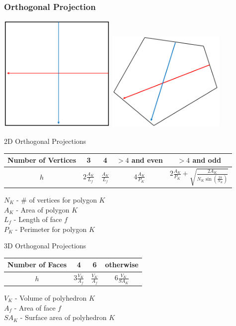 \documentclass[compress,10pt]{beamer}
\begin{document}
\begin{frame}[t]
\frametitle{Orthogonal Projection}
{
\vspace{1cm}
{}\includegraphics[width=0.425\textwidth]{images/Orth_proj_square.png} \hfill
{}\includegraphics[width=0.425\textwidth]{images/Orth_proj_pentagon.png}
}
{
\begin{block}{2D Orthogonal Projections}
\begin{table}
\centering
\begin{tabular}{|c|c|c|c|c|}
	\hline
	Number of Vertices & 3 & 4 & $>4$ and even& $>4$ and odd \\
	\hline
	$h$ & $2 \frac{A_K}{L_f}$ & $\frac{A_K}{L_f}$ & $4 \frac{A_K}{P_K}$ & $2 \frac{A_K}{P_K} + \sqrt{\frac{2 A_K}{N_K \sin(\frac{2 \pi}{N_K})}}$ \\
	\hline
\end{tabular}
\end{table}
\vspace{3mm}
$N_K$ - \# of vertices for polygon $K$\\
$A_K$ - Area of polygon $K$\\
$L_f$  - Length of face $f$\\
$P_K$ - Perimeter for polygon $K$
\end{block}
\begin{block}{3D Orthogonal Projections}
\begin{table}
\centering
\begin{tabular}{|c|c|c|c|}
	\hline
	Number of Faces & 4 & 6 & otherwise \\
	\hline
	$h$ & $3 \frac{V_K}{A_f}$ & $\frac{V_K}{A_f}$ & $6 \frac{V_K}{SA_K}$  \\ [1ex]
	\hline
\end{tabular}
\end{table}
\vspace{3mm}
$V_K$  - Volume of polyhedron $K$\\
$A_f$   - Area of face $f$\\
$SA_K$ - Surface area of polyhedron $K$
\end{block}
}
\end{frame}
\end{document}
